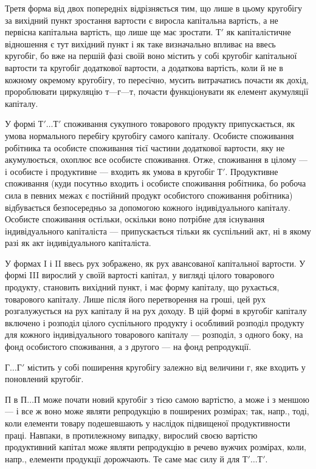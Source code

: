 Третя форма від двох попередніх відрізняється тим, що лише в цьому
кругобігу за вихідний пункт зростання вартости є виросла капітальна
вартість, а не первісна капітальна вартість, що лише ще має зростати.
$Т'$ як капіталістичне відношення є тут вихідний пункт і як таке визначально
впливає на ввесь кругобіг, бо вже на першій фазі
своїй воно містить у собі кругобіг капітальної вартости та кругобіг
додаткової вартости, а додаткова вартість, коли й не в кожному окремому
кругобігу, то пересічно, мусить витрачатись почасти як дохід, пророблювати
циркуляцію $т — г — т$, почасти функціонувати як елемент акумуляції капіталу.

У формі $Т'\dots{} Т'$ споживання сукупного товарового продукту припускається, як умова нормального
перебігу кругобігу самого капіталу. Особисте споживання робітника та особисте споживання тієї
частини додаткової вартости, яку не акумулюється, охоплює все особисте споживання. Отже, споживання
в цілому — і особисте і продуктивне — входить як умова в кругобіг $Т'$. Продуктивне споживання (куди
посутньо входить і особисте споживання робітника, бо робоча сила в певних межах є постійний продукт
особистого споживання робітника) відбувається безпосередньо за допомогою кожного індивідуального
капіталу.
Особисте споживання остільки, оскільки воно потрібне для існування
індивідуального капіталіста — припускається тільки як суспільний акт, ні в якому разі як акт
індивідуального капіталіста.

У формах I і II ввесь рух зображено, як рух авансованої капітальної вартости. У формі III вирослий у
своїй вартості капітал, у вигляді цілого товарового продукту, становить вихідний пункт, і має форму
капіталу, що рухається, товарового капіталу. Лише після його перетворення на гроші, цей рух
розгалужується на рух капіталу й на рух доходу. В цій формі в кругобіг капіталу включено і розподіл
цілого суспільного продукту і особливий розподіл продукту для кожного індивідуального товарового
капіталу — розподіл, з одного боку, на фонд особистого споживання, а з другого — на фонд
репродукції.

$Г\dots{} Г'$ містить у собі поширення кругобігу залежно від величини $г$, яке
входить у поновлений кругобіг.

$П$ в $П\dots{} П$ може почати новий кругобіг з тією самою вартістю, а може і з меншою — і все ж воно може
являти репродукцію в поширених розмірах; так, напр., тоді, коли елементи товару подешевшають у
наслідок підвищеної продуктивности праці. Навпаки, в протилежному випадку, вирослий своєю вартістю
продуктивний капітал може являти репродукцію в речево вужчих розмірах, коли, напр., елементи
продукції дорожчають. Те саме має силу й для $Т'\dots{} Т'$.

